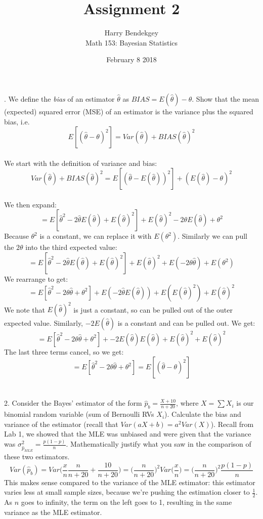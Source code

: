 \documentclass{article}
\title{Assignment 2}
\author{Harry Bendekgey \\ Math 153: Bayesian Statistics}
\date{February 8 2018}
\begin{document}
.  We define the {\it bias} of an estimator $\hat{\theta}$ as $BIAS = E(\hat{\theta})-\theta$.  Show that the mean (expected) squared error (MSE) of an estimator is the variance plus the squared bias, i.e. 
$$E[(\hat{\theta}-\theta)^2]=Var(\hat{\theta}) + BIAS(\hat{\theta})^2$$
\\We start with the definition of variance and bias:
$$Var(\hat{\theta}) + BIAS(\hat{\theta})^2 = E[(\hat{\theta}-E(\hat{\theta}))^2] + (E(\hat \theta) - \theta)^2$$
\\We then expand:
$$= E[\hat{\theta}^2-2\hat{\theta}E(\hat{\theta}) + E(\hat{\theta})^2] + E(\hat \theta)^2 - 2\theta E(\hat \theta) + \theta^2$$
Because $\theta^2$ is a constant, we can replace it with $E(\theta^2)$. Similarly we can pull the $2\theta$ into the third expected value:
$$= E[\hat{\theta}^2-2\hat{\theta}E(\hat{\theta}) + E(\hat{\theta})^2] + E(\hat \theta)^2 + E(-2 \theta \hat \theta) + E(\theta^2)$$
We rearrange to get:
$$= E[\hat{\theta}^2 -2 \theta \hat \theta + \theta^2] + E(-2\hat{\theta}E(\hat{\theta})) + E(E(\hat{\theta})^2) + E(\hat \theta)^2$$
We note that $E(\hat{\theta})^2$ is just a constant, so can be pulled out of the outer expected value. Similarly, $-2E(\hat \theta)$ is a constant and can be pulled out. We get:
$$= E[\hat{\theta}^2 -2 \theta \hat \theta + \theta^2] + -2E(\hat{\theta})E(\hat{\theta}) + E(\hat{\theta})^2 + E(\hat \theta)^2$$
The last three terms cancel, so we get:
$$= E[\hat{\theta}^2 -2 \theta \hat \theta + \theta^2] = E[(\hat{\theta}-\theta)^2]$$
\\\\2.  Consider the Bayes' estimator of the form $\hat{p}_b = \frac{X + 10}{n + 20}$, where $X=\sum X_i$ is our binomial random variable (sum of Bernoulli RVs $X_i$).  Calculate the bias and variance of the estimator  (recall that $Var(aX+b)=a^2Var(X)$).  Recall from Lab 1, we showed that the MLE was unbiased and were given that the variance was $\sigma^2_{\hat{p}_{MLE}}=\frac{p(1-p)}{n}$. Mathematically justify what you saw in the comparison of these two estimators.
$$Var(\hat p_b) = Var\bigg(\frac{x}{n}\frac{n}{n+20}+\frac{10}{n+20}\bigg) = \bigg(\frac{n}{n+20}\bigg)^2 Var\bigg(\frac{x}{n}\bigg) = \bigg(\frac{n}{n+20}\bigg)^2 \frac{p(1-p)}{n}$$
This makes sense compared to the variance of the MLE estimator: this estimator varies less at small sample sizes, because we're pushing the estimation closer to $\frac{1}{2}$. As $n$ goes to infinity, the term on the left goes to 1, resulting in the same variance as the MLE estimator.
\end{document}

